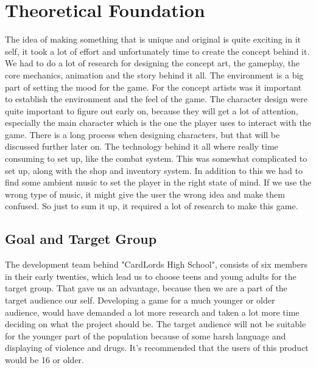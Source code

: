 \section{Theoretical Foundation}
\label{sec:Reasearch} The idea of making something that is unique and original is quite exciting in it self, it took a lot of effort and unfortunately time to create the concept behind it. We had to do a lot of research for designing the concept art, the gameplay, the core mechanics, animation and the story behind it all. The environment is a big part of setting the mood for the game. For the concept artists was it important to establish the environment and the feel of the game. The character design were quite important to figure out early on, because they will get a lot of attention, especially the main character which is the one the player uses to interact with the game. There is a long process when designing characters, but that will be discussed further later on. The technology behind it all where really time consuming to set up, like the combat system. This was somewhat complicated to set up, along with the shop and inventory system. In addition to this we had to find some ambient music to set the player in the right state of mind. If we use the wrong type of music, it might give the user the wrong idea and make them confused. So just to sum it up, it required a lot of research to make this game.


\subsection{Goal and Target Group}
\label{sec:GoalAndTarget}
The development team behind "CardLords High School", consists of six members in their early twenties, which lead us to choose teens and young adults for the target group. That gave us an advantage, because then we are a part of the target audience our self. Developing a game for a much younger or older audience, would have demanded a lot more research and taken a lot more time deciding on what the project should be.    
The target audience will not be suitable for the younger part of the population because of some harsh language and displaying of violence and drugs. It's recommended that the users of this product would be 16 or older.

\newpage
